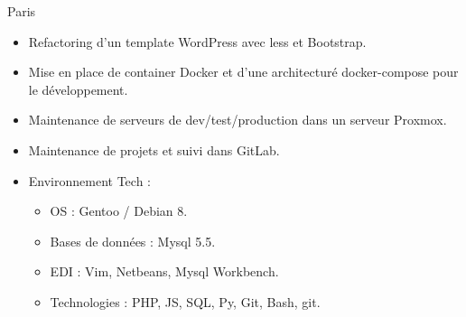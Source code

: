 \documentclass[10pt,a4paper,sans]{moderncv}
\begin{document}
{Paris}{
  \begin{itemize}%
    \item Refactoring d'un template WordPress avec less et Bootstrap.
    \item Mise en place de container Docker et d'une architecturé docker-compose pour le développement.
    \item Maintenance de serveurs de dev/test/production dans un serveur Proxmox.
    \item Maintenance de projets et suivi dans GitLab.
    \item Environnement Tech :
      \begin{itemize}%
        \item OS : Gentoo / Debian 8.
        \item Bases de données : Mysql 5.5.
        \item EDI : Vim, Netbeans, Mysql Workbench.
        \item Technologies : PHP, JS, SQL, Py, Git, Bash, git.
      \end{itemize}
  \end{itemize}}
\end{document}
